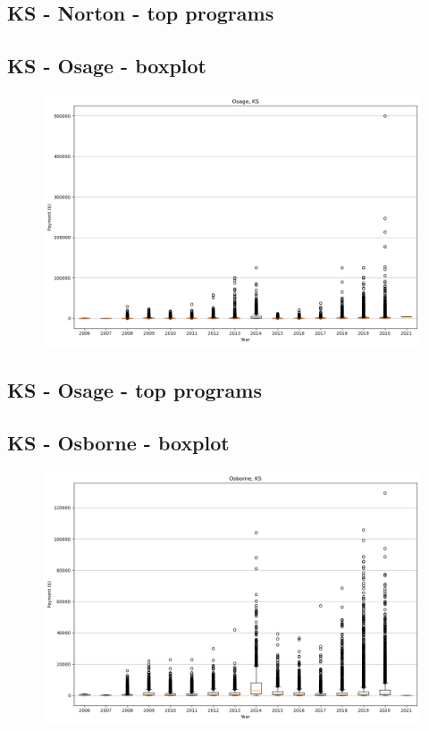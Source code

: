 \subsection*{KS - Norton - top programs}

\newpage
\subsection*{KS - Osage - boxplot}
\begin{figure}[h]
\centering
\includegraphics[width=7in]{../output/boxplots/counties/Osage-KS_boxplot.png}
\end{figure}


\subsection*{KS - Osage - top programs}

\newpage
\subsection*{KS - Osborne - boxplot}
\begin{figure}[h]
\centering
\includegraphics[width=7in]{../output/boxplots/counties/Osborne-KS_boxplot.png}
\end{figure}



